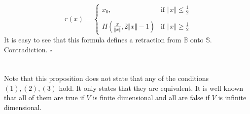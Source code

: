 \documentclass[12pt]{article}
\begin{document}
$$r(x)=\left\{\begin{matrix} x_0, & \mbox{if }\Vert x\Vert\leq\frac{1}{2} \\ & \\ H(\frac{x}{\Vert x\Vert},2\Vert x\Vert -1) & \mbox{if }\Vert x\Vert\geq\frac{1}{2}\end{matrix}\right.$$
It is easy to see that this formula defines a retraction from $\mathbb{B}$ onto $\mathbb{S}$. Contradiction. $\square$\\ \\ \\
Note that this proposition does not state that any of the conditions $\mathrm{(1)},\mathrm{(2)},\mathrm{(3)}$ hold. It only states that they are equivalent. It is well known that all of them are true if $V$ is finite dimensional and all are false if $V$ is infinite dimensional.
\end{document}
